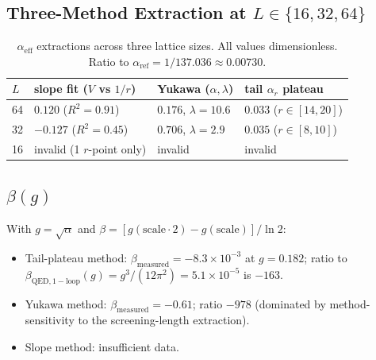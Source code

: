 \documentclass[11pt,letterpaper]{article}
\newcommand{\alphaREF}{\alpha_{\mathrm{ref}}}
\begin{document}
\subsection{Three-Method Extraction at $L \in \{16, 32, 64\}$}

\begin{table}[h]
\centering
\caption{$\alpha_{\mathrm{eff}}$ extractions across three lattice sizes.
All values dimensionless. Ratio to $\alphaREF = 1/137.036 \approx
0.00730$.}
\label{tab:alpha-scales}
\begin{tabular}{llll}
\toprule
$L$ & slope fit ($V$ vs $1/r$) & Yukawa ($\alpha, \lambda$) & tail $\alpha_r$ plateau \\
\midrule
64 & $0.120$ ($R^2 = 0.91$) & $0.176$, $\lambda = 10.6$ & $0.033$ ($r \in [14,20]$) \\
32 & $-0.127$ ($R^2 = 0.45$) & $0.706$, $\lambda = 2.9$ & $0.035$ ($r \in [8,10]$) \\
16 & invalid (1 $r$-point only) & invalid & invalid \\
\bottomrule
\end{tabular}
\end{table}

\subsection{$\beta(g)$}

With $g = \sqrt{\alpha}$ and $\beta = [g(\mathrm{scale} \cdot 2) -
g(\mathrm{scale})]/\ln 2$:

\begin{itemize}
  \item Tail-plateau method: $\beta_{\mathrm{measured}} = -8.3 \times 10^{-3}$
    at $g = 0.182$; ratio to $\beta_{\mathrm{QED,1-loop}}(g) = g^3/(12\pi^2)
    = 5.1 \times 10^{-5}$ is $-163$.
  \item Yukawa method: $\beta_{\mathrm{measured}} = -0.61$; ratio $-978$
    (dominated by method-sensitivity to the screening-length extraction).
  \item Slope method: insufficient data.
\end{itemize}
\end{document}
